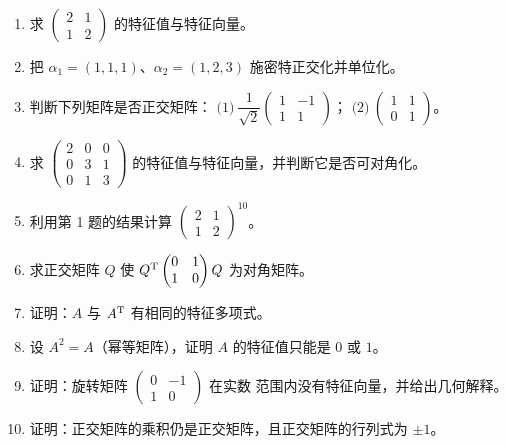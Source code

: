 
\begin{enumerate}[label=\arabic*., itemsep=2pt]
\item 求 $\begin{pmatrix} 2 & 1 \\ 1 & 2 \end{pmatrix}$ 的特征值与特征向量。
\item 把 $\alpha_1=(1,1,1)$、$\alpha_2=(1,2,3)$ 施密特正交化并单位化。
\item 判断下列矩阵是否正交矩阵：
  $\text{(1)}\ \dfrac{1}{\sqrt2}\begin{pmatrix} 1 & -1 \\ 1 & 1 \end{pmatrix}$；
  \quad $\text{(2)}\ \begin{pmatrix} 1 & 1 \\ 0 & 1 \end{pmatrix}$。
\item 求 $\begin{pmatrix} 2 & 0 & 0 \\ 0 & 3 & 1 \\ 0 & 1 & 3 \end{pmatrix}$
  的特征值与特征向量，并判断它是否可对角化。
\item 利用第 1 题的结果计算 $\begin{pmatrix} 2 & 1 \\ 1 & 2 \end{pmatrix}^{10}$。
\item 求正交矩阵 $Q$ 使 $Q^{\mathrm{T}}\begin{pmatrix} 0 & 1 \\ 1 & 0 \end{pmatrix}Q$
  为对角矩阵。
\item 证明：$A$ 与 $A^{\mathrm{T}}$ 有相同的特征多项式。
\item 设 $A^2=A$（幂等矩阵），证明 $A$ 的特征值只能是 $0$ 或 $1$。
\item 证明：旋转矩阵 $\begin{pmatrix} 0 & -1 \\ 1 & 0 \end{pmatrix}$ 在实数
  范围内没有特征向量，并给出几何解释。
\item 证明：正交矩阵的乘积仍是正交矩阵，且正交矩阵的行列式为 $\pm1$。
\end{enumerate}
